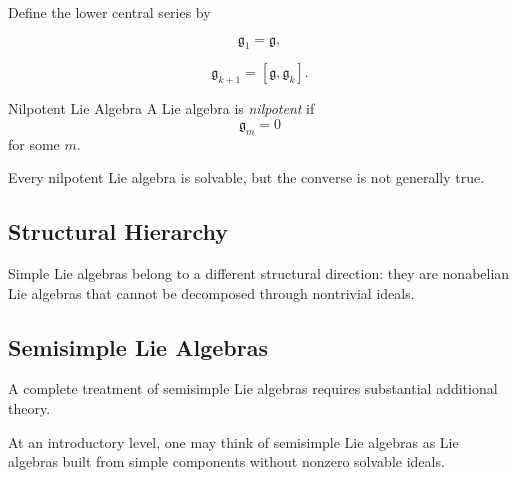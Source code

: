 Define the lower central series by

\[ \mathfrak g_1=\mathfrak g, \]

\[ \mathfrak g_{k+1}=[\mathfrak g,\mathfrak g_k]. \]

\begin{definitionbox}{Nilpotent Lie Algebra}
A Lie algebra is \emph{nilpotent} if
\[ \mathfrak g_m=0 \]
for some \(m\).
\end{definitionbox}

Every nilpotent Lie algebra is solvable, but the converse is not generally
true.

\subsection{Structural Hierarchy}
\label{subsec:lie-algebra-hierarchy}

\begin{center}
\end{center}

Simple Lie algebras belong to a different structural direction: they are
nonabelian Lie algebras that cannot be decomposed through nontrivial ideals.

\subsection{Semisimple Lie Algebras}
\label{subsec:semisimple-lie-algebras}

A complete treatment of semisimple Lie algebras requires substantial
additional theory.

At an introductory level, one may think of semisimple Lie algebras as Lie
algebras built from simple components without nonzero solvable ideals.

